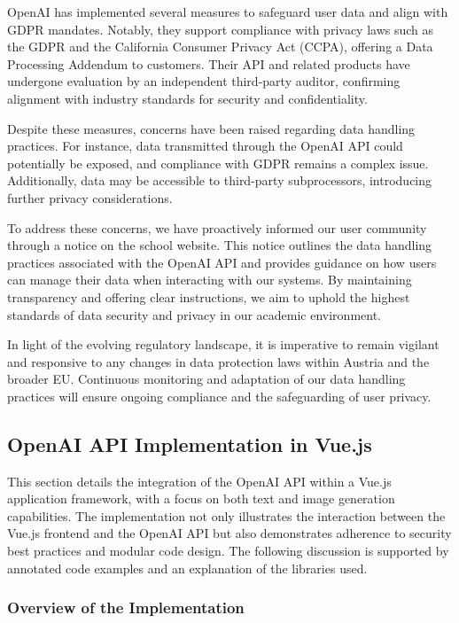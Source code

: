 OpenAI has implemented several measures to safeguard user data and align with GDPR mandates. 
Notably, they support compliance with privacy laws such as the GDPR and the California Consumer Privacy Act (CCPA), 
offering a Data Processing Addendum to customers. Their API and related products have undergone evaluation by an independent third-party auditor, 
confirming alignment with industry standards for security and confidentiality. 

\cite{OpenAI-Data-Residency-Europe}

Despite these measures, concerns have been raised regarding data handling practices. 
For instance, data transmitted through the OpenAI API could potentially be exposed, and compliance with GDPR remains a complex issue. Additionally, 
data may be accessible to third-party subprocessors, introducing further privacy considerations.

\cite{OpenAI-privacy-complaint-Austria}

To address these concerns, we have proactively informed our user community through a notice on the school website. 
This notice outlines the data handling practices associated with the OpenAI API and provides guidance on how users can manage their data when 
interacting with our systems. By maintaining transparency and offering clear instructions, 
we aim to uphold the highest standards of data security and privacy in our academic environment.

In light of the evolving regulatory landscape, it is imperative to remain vigilant and responsive to any changes in data protection laws within 
Austria and the broader EU. Continuous monitoring and adaptation of our data handling practices will ensure ongoing compliance and the safeguarding of user privacy. 


\subsection{OpenAI API Implementation in Vue.js}

This section details the integration of the OpenAI API within a Vue.js application framework, with a focus on both text and image generation capabilities. The implementation not only illustrates the interaction between the Vue.js frontend and the OpenAI API but also demonstrates adherence to security best practices and modular code design. The following discussion is supported by annotated code examples and an explanation of the libraries used.

\subsubsection{Overview of the Implementation}

